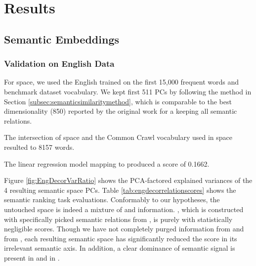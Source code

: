 \chapter{Results} %

\label{chap:results} %

\section{Semantic Embeddings}
\subsection{Validation on English Data}
For  space, we used the English  trained on the first 15,000 frequent words and benchmark dataset vocabulary. We kept first 511 PCs by following the method in Section \ref{subsec:semanticsimilaritymethod}, which is comparable to the best dimensionality (850) reported by the original work \parencite{saediWordNetEmbeddings2018} for a  keeping all semantic relations.

The intersection of  space and the Common Crawl vocabulary used in  space resulted to 8157 words. 

The linear regression model mapping  to  produced a  score of 0.1662.

Figure \ref{fig:EngDecorVarRatio} shows the PCA-factored explained variances of the 4 resulting semantic space PCs. Table \ref{tab:engdecorrelationscores} shows the semantic ranking task evaluations. Conformably to our hypotheses, the untouched  space is indeed a mixture of \similarity and \association information. , which is constructed with specifically picked semantic relations from , is purely \similarity with statistically negligible \association scores. Though we have not completely purged \similarity information from  and \association from , each resulting semantic space has significantly reduced the score in its irrelevant semantic axis. In addition, a clear dominance of \association semantic signal is present in  and \similarity in . 


